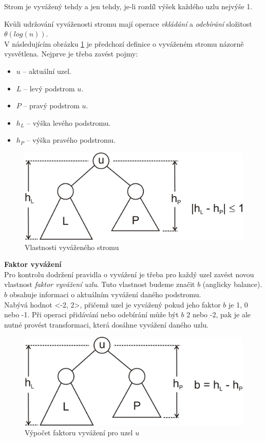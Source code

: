 \documentclass[
  biblatex=false,
  font=serif,
  glossaries=false,
  tables=false,
  theorems=false,
  index
]{kidiplom}
\begin{document}
\begin{definition}
Strom je vyvážený tehdy a jen tehdy, je-li rozdíl výšek každého uzlu nejvýše 1.\cite{Adelson}\cite{dvorsky}
\end{definition}

\noindent Kvůli udržování vyváženosti stromu mají operace \textit{vkládání} a \textit{odebírání} složitost $\theta(log (n))$.\\
\newpage
\noindent V následujícím obrázku \ref{vyvazenyStrom} je předchozí definice o vyváženém stromu názorně vysvětlena. Nejprve je třeba zavést pojmy:
\begin{itemize}
\item $u$ -- aktuální uzel.
\item $L$ -- levý podstrom $u$.
\item $P$ -- pravý podstrom $u$.
\item $h_L$ -- výška levého podstromu.
\item $h_P$ -- výška pravého podstromu.
\end{itemize}

\begin{figure}[h!]
\centering
	\includegraphics[scale=0.3]{obrazky/8AVLVyvazenyStrom.png}
	\caption{Vlastnosti vyváženého stromu}
	\label{vyvazenyStrom}
\end{figure}

\noindent\textbf{Faktor vyvážení}\\
\indent Pro kontrolu dodržení pravidla o vyvážení je třeba pro každý uzel zavést novou vlastnost \textit{faktor vyvážení uzlu}. Tuto vlastnost budeme značit $b$ (anglicky balance). $b$ obsahuje informaci o aktuálním vyvážení daného podstromu.\\ 
\indent Nabývá hodnot <-2, 2>, přičemž uzel je vyvážený pokud jeho faktor $b$ je 1, 0 nebo -1. Při operaci přidávání nebo odebírání může být $b$ 2 nebo -2, pak je ale nutné provést transformaci, která dosáhne vyvážení daného uzlu.

\begin{figure}[h!]
\centering
	\includegraphics[scale=0.3]{obrazky/9AVLFaktor.png}
	\caption{Výpočet faktoru vyvážení pro uzel $u$}
\end{figure}
\end{document}
